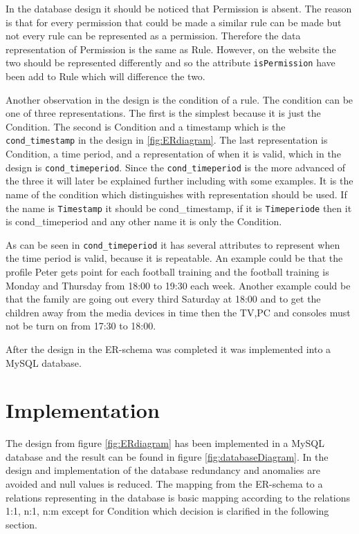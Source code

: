 In the database design it should be noticed that Permission is absent. The reason is that for every permission that could be made a similar rule can be made but not every rule can be represented as a permission. Therefore the data representation of Permission is the same as Rule. However, on the website the two should be represented differently and so the attribute \texttt{isPermission} have been add to Rule which will difference the two.

Another observation in the design is the condition of a rule. The condition can be one of three representations. The first is the simplest because it is just the Condition. The second is Condition and a timestamp which is the \texttt{cond\_timestamp} in the design in \ref{fig:ERdiagram}. The last representation is Condition, a time period, and a representation of when it is valid, which in the design is \texttt{cond\_timeperiod}. Since the \texttt{cond\_timeperiod} is the more advanced of the three it will later be explained further including with some examples. It is the name of the condition which distinguishes with representation should be used. If the name is \texttt{Timestamp} it should be cond\_timestamp, if it is \texttt{Timeperiode} then it is cond\_timeperiod and any other name it is only the Condition.


As can be seen in \texttt{cond\_timeperiod} it has several attributes to represent when the time period is valid, because it is repeatable. An example could be that the profile Peter gets point for each football training and the football training is Monday and Thursday from 18:00 to 19:30 each week. Another example could be that the family are going out every third Saturday at 18:00 and to get the children away from the media devices in time then the TV,PC and consoles must not be turn on from 17:30 to 18:00. 

After the design in the ER-schema was completed it was implemented into a MySQL database.  

\section{Implementation}

The design from figure \ref{fig:ERdiagram} has been implemented in a MySQL database and the result can be found in figure \ref{fig:databaseDiagram}. In the design and implementation of the database redundancy and anomalies are avoided and null values is reduced. 
The mapping from the ER-schema to a relations representing in the database is basic mapping according to the relations 1:1, n:1, n:m except for Condition which decision is clarified in the following section. 

